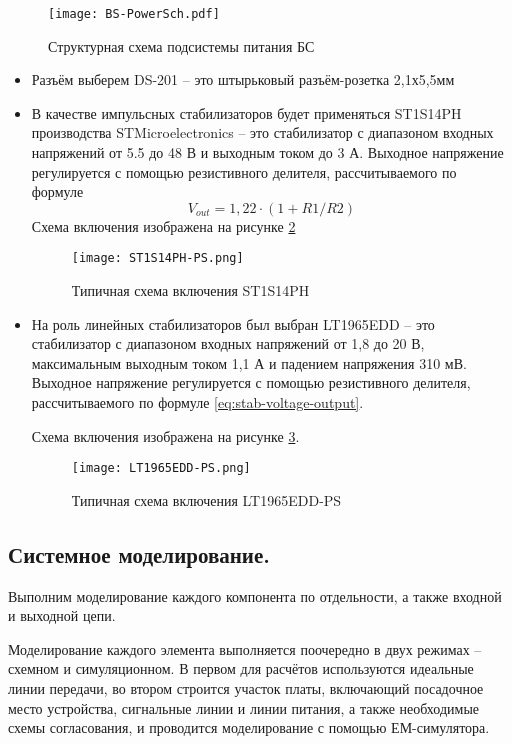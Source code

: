 \begin{figure}[H]
	\centering
	\texttt{[image: BS-PowerSch.pdf]}
	\caption{Структурная схема подсистемы питания БС}%
	\label{fig:BS-PowerSch}
\end{figure}

\begin{itemize}
	\item Разъём выберем DS-201 – это штырьковый разъём-розетка 2,1х5,5мм
	\item В качестве импульсных стабилизаторов будет применяться ST1S14PH производства STMicroelectronics – это стабилизатор с диапазоном входных напряжений от 5.5 до 48 В и выходным током до 3 А. Выходное напряжение регулируется с помощью резистивного делителя, рассчитываемого по формуле 
	\begin{equation}
		\label{eq:stab-voltage-output}
		V_{out}=1,22\cdot(1+R1/R2)
	\end{equation}
	Схема включения изображена на рисунке \ref{fig:ST1S14PH-PS}
	\begin{figure}[H]
		\centering
		\texttt{[image: ST1S14PH-PS.png]}
		\caption{Типичная схема включения ST1S14PH}%
		\label{fig:ST1S14PH-PS}
	\end{figure}
	
	\item На роль линейных стабилизаторов был выбран LT1965EDD – это стабилизатор с диапазоном входных напряжений от 1,8 до 20 В, максимальным выходным током 1,1 А и падением напряжения 310 мВ. Выходное напряжение регулируется с помощью резистивного делителя, рассчитываемого по формуле \ref{eq:stab-voltage-output}.

	Схема включения изображена на рисунке \ref{fig:LT1965EDD-PS}.

	\begin{figure}[H]
		\centering
		\texttt{[image: LT1965EDD-PS.png]}
		\caption{Типичная схема включения LT1965EDD-PS}%
		\label{fig:LT1965EDD-PS}
	\end{figure}
\end{itemize}

\subsection{Системное моделирование.}
Выполним моделирование каждого компонента по отдельности, а также входной и выходной цепи.

Моделирование каждого элемента выполняется поочередно в двух режимах – схемном и симуляционном. В первом для расчётов используются идеальные линии передачи, во втором строится  участок платы, включающий посадочное место устройства, сигнальные линии и линии питания, а также необходимые схемы согласования, и проводится моделирование с помощью ЕМ-симулятора.

